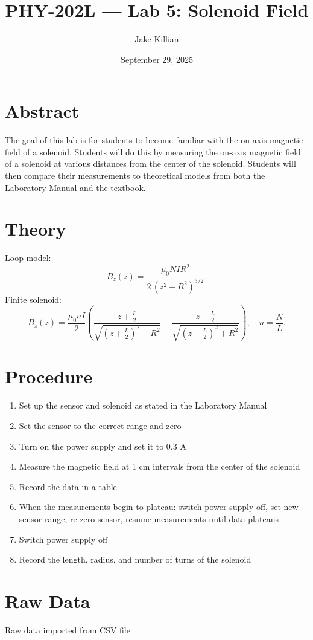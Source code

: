 \documentclass[11pt]{article}
\title{PHY-202L — Lab 5: Solenoid Field}
\author{Jake Killian}
\date{September 29, 2025}
\begin{document}
\maketitle

\section{Abstract}
The goal of this lab is for students to become familiar with the on-axis magnetic field of a solenoid.
Students will do this by measuring the on-axis magnetic field of a solenoid at various distances from the center of the solenoid.
Students will then compare their measurements to theoretical models from both the Laboratory Manual and the textbook.

\section{Theory}
Loop model:
\[
B_z(z) = \frac{\mu_0 N I R^2}{2\,(z^2 + R^2)^{3/2}}.
\]
Finite solenoid:
\[
B_z(z)=\frac{\mu_0 n I}{2}\!\left(
\frac{z+\tfrac{L}{2}}{\sqrt{(z+\tfrac{L}{2})^2+R^2}}
-\frac{z-\tfrac{L}{2}}{\sqrt{(z-\tfrac{L}{2})^2+R^2}}
\right),\quad n=\frac{N}{L}.
\]

\section{Procedure}
\begin{enumerate}
    \item Set up the sensor and solenoid as stated in the Laboratory Manual
    \item Set the sensor to the correct range and zero
    \item Turn on the power supply and set it to 0.3 A
    \item Measure the magnetic field at 1 cm intervals from the center of the solenoid
    \item Record the data in a table
    \item When the measurements begin to plateau: switch power supply off, set new sensor range, re-zero sensor, resume measurements until data plateaus
    \item Switch power supply off
    \item Record the length, radius, and number of turns of the solenoid
\end{enumerate}

\section{Raw Data}
\begin{table}[H]
    \centering
    \caption{Raw data imported from CSV file}
    \label{tab:rawcsv}
\end{table}
\end{document}
